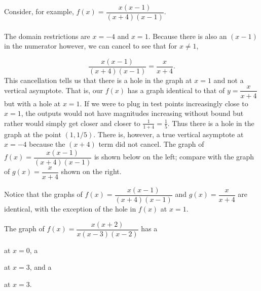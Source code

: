 \documentclass{ximera}
\begin{document}
\begin{example}
Consider, for example, $f(x)=\dfrac{x(x-1)}{(x+4)(x-1)}$.
\\
\\The domain restrictions are $x=-4$ and $x=1$. Because there is also an $(x-1)$ in the numerator however, we can cancel to see that for $x\neq 1$, 

$$
\dfrac{x(x-1)}{(x+4)(x-1)}=\dfrac{x}{x+4}.
$$ 
This cancellation tells us that there is a hole in the graph at $x=1$ and not a vertical asymptote. That is, our $f(x)$ has a graph identical to that of $y=\dfrac{x}{x+4}$ but with a hole at $x=1$. If we were to plug in test points increasingly close to $x=1$, the outputs would not have magnitudes increasing without bound but rather would simply get closer and closer to $\frac{1}{1+4}=\frac{1}{5}$. Thus there is a hole in the graph at the point $(1,1/5)$. There is, however, a true vertical asymptote at $x=-4$ because the $(x+4)$ term did not cancel. The graph of $f(x)=\dfrac{x(x-1)}{(x+4)(x-1)}$ is shown below on the left; compare with the graph of $g(x)=\dfrac{x}{x+4}$ shown on the right.

\begin{center}\hfill
{}\end{center}

Notice that the graphs of $f(x)=\dfrac{x(x-1)}{(x+4)(x-1)}$ and $g(x)=\dfrac{x}{x+4}$ are identical, with the exception of the hole in $f(x)$ at $x=1$.
\end{example}

\begin{example}
The graph of $f(x)=\dfrac{x(x+2)}{x(x-3)(x-2)}$ has a 
  \begin{multipleChoice}
  \end{multipleChoice} at $x=0$, a
    \begin{multipleChoice}
  \end{multipleChoice} at $x=3$, and a 
     \begin{multipleChoice}
  \end{multipleChoice} at $x=3$.
\end{example}
\end{document}
